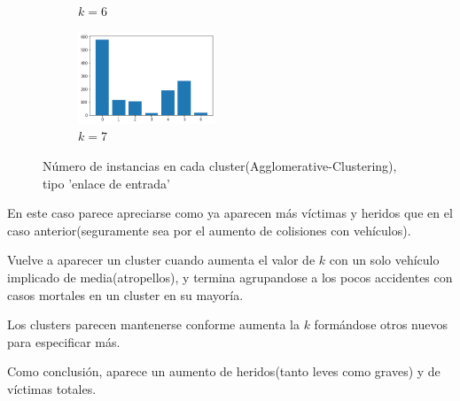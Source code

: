 \begin{figure}[H]
\begin{subfigure}{.5\textwidth}
  \caption{$k=6$}
\end{subfigure}
\begin{subfigure}{.5\textwidth}
  \centering
  \includegraphics[width=0.45\textwidth]{imagenes/counter/entrada/agg7.png}
  \caption{$k=7$}
\end{subfigure}
\caption{Número de instancias en cada cluster(Agglomerative-Clustering), tipo 'enlace de entrada'}
\label{fig:hm-km}
\end{figure}

En este caso parece apreciarse como ya aparecen más víctimas y heridos que en el caso anterior(seguramente sea por el aumento de colisiones con vehículos).

Vuelve a aparecer un cluster cuando aumenta el valor de $k$ con un solo vehículo implicado de media(atropellos), y termina agrupandose a los pocos accidentes con casos mortales en un cluster en su mayoría. 

Los clusters parecen mantenerse conforme aumenta la $k$ formándose otros nuevos para especificar más.

Como conclusión, aparece un aumento de heridos(tanto leves como graves) y de víctimas totales.
